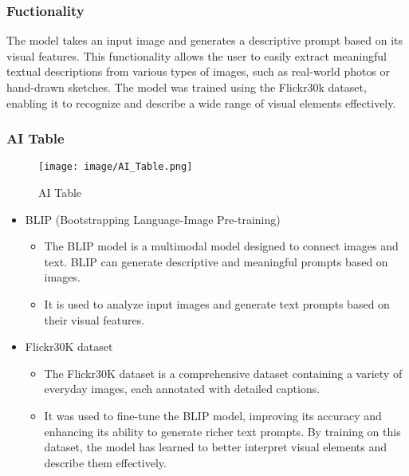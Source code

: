 \documentclass[conference]{IEEEtran}
\begin{document}
\subsubsection{Fuctionality}
\noindent The model takes an input image and generates a descriptive prompt based on its visual features. This functionality allows the user to easily extract meaningful textual descriptions from various types of images, such as real-world photos or hand-drawn sketches. The model was trained using the Flickr30k dataset, enabling it to recognize and describe a wide range of visual elements effectively.\\

\subsubsection{AI Table}

\begin{figure}[h!]
    \centering
    \texttt{[image: image/AI\_Table.png]}
    \caption{AI Table}
    \label{fig:enter-label}
\end{figure}

\begin{itemize}
    \item BLIP (Bootstrapping Language-Image Pre-training)
\begin{itemize}
    \item The BLIP model is a multimodal model designed to connect images and text. BLIP can generate descriptive and meaningful prompts based on images.\\
    \item It is used to analyze input images and generate text prompts based on their visual features.\\
\end{itemize}
\end{itemize}

\begin{itemize}
    \item Flickr30K dataset
\begin{itemize}
    \item The Flickr30K dataset is a comprehensive dataset containing a variety of everyday images, each annotated with detailed captions.\\
    \item It was used to fine-tune the BLIP model, improving its accuracy and enhancing its ability to generate richer text prompts. By training on this dataset, the model has learned to better interpret visual elements and describe them effectively.\\
\end{itemize}
\end{itemize}
\end{document}
